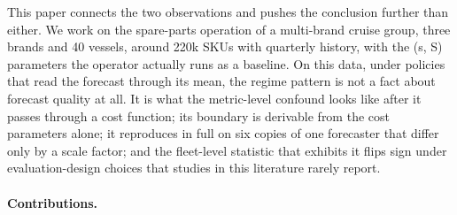 \documentclass[11pt]{article}
\begin{document}
This paper connects the two observations and pushes the conclusion further
than either. We work on the spare-parts operation of a multi-brand cruise
group, three brands and 40 vessels, around 220k SKUs with quarterly history,
with the (s, S) parameters the operator actually runs as a baseline. On this
data, under policies that read the forecast through its mean, the regime
pattern is not a fact about forecast quality at all. It is
what the metric-level confound looks like after it passes through a cost
function; its boundary is derivable from the cost parameters alone; it
reproduces in full on six copies of one forecaster that differ only by a scale
factor; and the fleet-level statistic that exhibits it flips sign under
evaluation-design choices that studies in this literature rarely report.

\paragraph{Contributions.}
\end{document}
